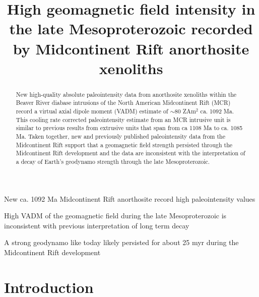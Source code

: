 \documentclass[draft]{agujournal2019}
\begin{document}
\title{High geomagnetic field intensity in the late Mesoproterozoic recorded by Midcontinent Rift anorthosite xenoliths}





\begin{keypoints}
\item New ca. 1092 Ma Midcontinent Rift anorthosite record high paleointensity values
\item High VADM of the geomagnetic field during the late Mesoproterozoic is inconsistent with previous interpretation of long term decay
\item A strong geodynamo like today likely persisted for about 25 myr during the Midcontinent Rift development
\end{keypoints}





\begin{abstract}
New high-quality absolute paleointensity data from anorthosite xenoliths within the Beaver River diabase intrusions of the North American Midcontinent Rift (MCR) record a virtual axial dipole moment (VADM) estimate of $\sim$80 ZAm$^2$ ca. 1092 Ma. This cooling rate corrected paleointensity estimate from an MCR intrusive unit is similar to previous results from extrusive units that span from ca 1108 Ma to ca. 1085 Ma. Taken together, new and previously published paleointensity data from the Midcontinent Rift support that a geomagnetic field strength persisted through the Midcontinent Rift development and the data are inconsistent with the interpretation of a decay of Earth's geodynamo strength through the late Mesoproterozoic. 


\end{abstract}

\section*{Introduction}
\end{document}
